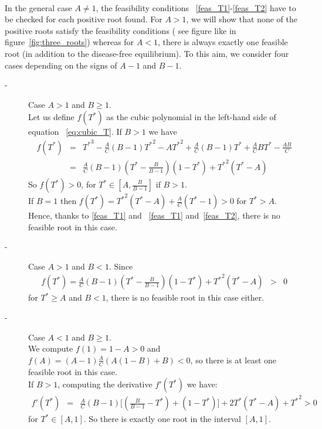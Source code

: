 \documentclass[a4paper, 12pt]{article}
\providecommand{\DIFaddtex}[1]{{\protect\color{blue} \sf #1}} %
\providecommand{\DIFdeltex}[1]{{\protect\color{red} \scriptsize #1}} %
\providecommand{\DIFaddbegin}{} %
\providecommand{\DIFaddend}{} %
\providecommand{\DIFdelbegin}{} %
\providecommand{\DIFdelend}{} %
\providecommand{\DIFadd}[1]{\texorpdfstring{\DIFaddtex{#1}}{#1}} %
\providecommand{\DIFdel}[1]{\texorpdfstring{\DIFdeltex{#1}}{}} %
\begin{document}
\bigskip\\
In the general case $A \neq 1$, the feasibility conditions\DIFaddbegin \DIFadd{~}\DIFaddend \eqref{feas_T1}-\eqref{feas_T2} have to be checked for each positive root found. 
For $A>1$, we will show that none of the positive roots satisfy the feasibility conditions (\DIFdelbegin \DIFdel{see figure}\DIFdelend \DIFaddbegin \DIFadd{like in figure~}\DIFaddend \ref{fig:three_roots}) whereas for $A<1$, there is always exactly one feasible root (in addition to the disease-free equilibrium). 
To this aim, we consider four cases  depending on the signs of $A - 1$ and $B - 1$.
\begin{description}
\item[-] Case $A > 1$ and $B \geq 1$.\\ 
Let us define $f(T^*)$ as the cubic polynomial in the left-hand side of equation\DIFaddbegin \DIFadd{~}\DIFaddend \eqref{eq:cubic_T}. 
If $B>1$ we have
\begin{eqnarray*}
f(T^*)&=&{T^*}^3-\frac{A}{C}(B-1){T^*}^2-A{T^*}^2+\frac{A}{C}(B-1)T^*+\frac{A}{C}BT^*-\frac{AB}{C}\\\nonumber
&=&\frac{A}{C}(B-1)(T^*-\frac{B}{B-1})(1-T^*)+{T^*}^2(T^*-A)
\end{eqnarray*} 
So $f(T^*)>0$, for $T^* \in [A, \frac{B}{B-1}]$  if $B>1$.\\
If $B=1$ then $f(T^*)={T^*}^2(T^*-A)+\frac{A}{C}(T^*-1)>0$ for $T^*>A$.\\
Hence, thanks to\DIFdelbegin \DIFdel{\eqref{feas_T1} and }\DIFdelend \DIFaddbegin \DIFadd{~\eqref{feas_T1} and~}\DIFaddend \eqref{feas_T2}, there is no feasible root in this case.
\item[-] Case $A > 1$ and $B < 1$.
Since \begin{eqnarray*}
f(T^*)=\frac{A}{C}(B-1)(T^*-\frac{B}{B-1})(1-T^*)+{T^*}^2(T^*-A)&>&0
\end{eqnarray*}
for $T^* \geq A$ and $B<1$, there is no feasible root in this case either. 
\item[-] Case $A < 1$ and $B  \geq1$.\\
We compute $f(1)=1-A>0$ and $f(A)=(A-1)\frac{A}{C}(A(1-B)+B)<0$, so there is at least one feasible root in this case.\\
If $B>1$, computing the derivative $f'(T^*)$ we have:
\begin{eqnarray*}
f'(T^*) &=& \frac{A}{C}(B-1)\big[(\frac{B}{B-1}-T^*)+(1-T^*)\big]+2{T^*}(T^*-A)+{T^*}^2 >0
\end{eqnarray*}
for $T^* \in [A,1]$. So there is exactly one root in the interval $[A,1]$.

\end{description}
\end{document}
